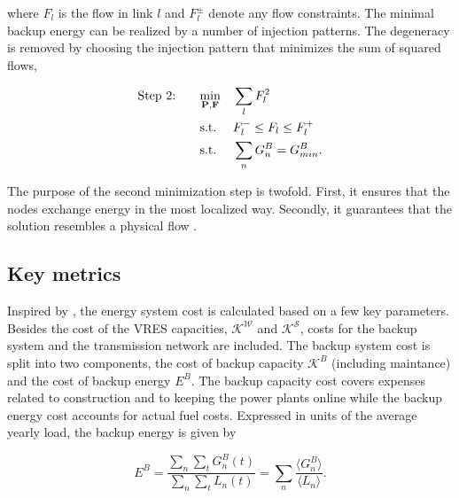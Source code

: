 \documentclass[a4paper, 5p, sort&compress]{elsarticle}%
\begin{document}
where $F_{l}$ is the flow in link $l$ and $F_{l}^{\pm}$ denote any
flow constraints.  The minimal backup energy can be realized by a
number of injection patterns. The degeneracy is removed by choosing
the injection pattern that minimizes the sum of squared flows,

\begin{equation}
  \begin{aligned}
    \label{eq:step2}
    \text{Step 2: \hspace{15pt}} & \underset{\mathbf{P}, \mathbf{F}}{\text{min}}
    & & \sum_{l} F_{l}^{2} \\
    & \text{s.t.}
    & & F_{l}^{-} \leq F_{l} \leq F_{l}^{+} \\
    & \text{s.t.}
    & & \sum_{n} G_{n}^{B} = G^{B}_{min} .
  \end{aligned}
\end{equation}

The purpose of the second minimization step is twofold. First, it
ensures that the nodes exchange energy in the most localized
way. Secondly, it guarantees that the solution resembles a physical
flow \cite{Magnus}. %

\subsection{Key metrics}

Inspired by \cite{Sensitivity}, the energy system cost is calculated
based on a few key parameters. Besides the cost of the VRES
capacities, $\mathcal{K^{W}}$ and $\mathcal{K^S}$, costs for the
backup system and the transmission network are included. The backup
system cost is split into two components, the cost of backup capacity
$\mathcal{K}^{B}$ (including maintance) and the cost of backup energy
$E^{B}$. The backup capacity cost covers expenses related to
construction and to keeping the power plants online while the backup
energy cost accounts for actual fuel costs. Expressed in units of
the average yearly load, the backup energy is given by

\begin{equation}
  \label{eq:backup-energy}
  E^{B} =\frac{\sum_{n} \sum_{t} G^{B}_{n}(t)}{\sum_{n} \sum_{t}
    L_{n}(t)} = \sum_{n} \frac{\langle G^{B}_{n} \rangle}{\langle L_{n}
    \rangle} .
\end{equation}
\end{document}
